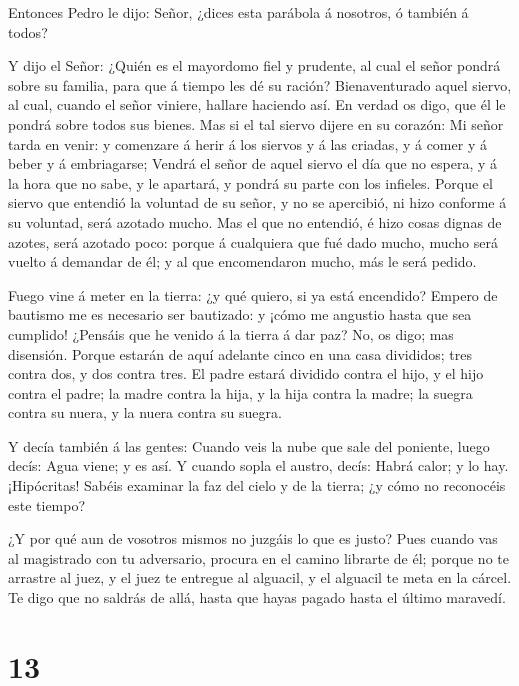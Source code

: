  Entonces Pedro le dijo: Señor, ¿dices esta parábola á
nosotros, ó también á todos?

 Y dijo el Señor: ¿Quién es el mayordomo fiel y prudente,
al cual el señor pondrá sobre su familia, para que á tiempo les dé su
ración?  Bienaventurado aquel siervo, al cual, cuando el
señor viniere, hallare haciendo así.  En verdad os digo,
que él le pondrá sobre todos sus bienes.  Mas si el tal
siervo dijere en su corazón: Mi señor tarda en venir: y comenzare á
herir á los siervos y á las criadas, y á comer y á beber y á
embriagarse;  Vendrá el señor de aquel siervo el día que no
espera, y á la hora que no sabe, y le apartará, y pondrá su parte con
los infieles.  Porque el siervo que entendió la voluntad de
su señor, y no se apercibió, ni hizo conforme á su voluntad, será
azotado mucho.  Mas el que no entendió, é hizo cosas dignas
de azotes, será azotado poco: porque á cualquiera que fué dado mucho,
mucho será vuelto á demandar de él; y al que encomendaron mucho, más le
será pedido.

 Fuego vine á meter en la tierra: ¿y qué quiero, si ya está
encendido?  Empero de bautismo me es necesario ser
bautizado: y ¡cómo me angustio hasta que sea cumplido! 
¿Pensáis que he venido á la tierra á dar paz? No, os digo; mas
disensión.  Porque estarán de aquí adelante cinco en una
casa divididos; tres contra dos, y dos contra tres.  El
padre estará dividido contra el hijo, y el hijo contra el padre; la
madre contra la hija, y la hija contra la madre; la suegra contra su
nuera, y la nuera contra su suegra.

 Y decía también á las gentes: Cuando veis la nube que sale
del poniente, luego decís: Agua viene; y es así.  Y cuando
sopla el austro, decís: Habrá calor; y lo hay. 
¡Hipócritas! Sabéis examinar la faz del cielo y de la tierra; ¿y cómo no
reconocéis este tiempo?

 ¿Y por qué aun de vosotros mismos no juzgáis lo que es
justo?  Pues cuando vas al magistrado con tu adversario,
procura en el camino librarte de él; porque no te arrastre al juez, y el
juez te entregue al alguacil, y el alguacil te meta en la cárcel.
 Te digo que no saldrás de allá, hasta que hayas pagado
hasta el último maravedí.

\hypertarget{section-12}{%
\section{13}\label{section-12}}

